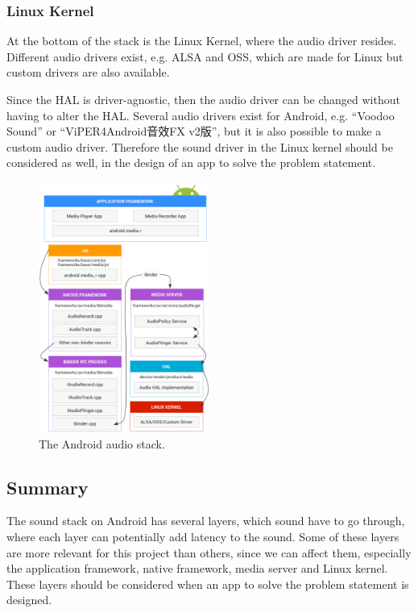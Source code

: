 \subsubsection*{Linux Kernel}
At the bottom of the stack is the Linux Kernel, where the audio driver resides.
Different audio drivers exist, e.g. \ac{ALSA} and \ac{OSS}, which are made for Linux but custom drivers are also available.

Since the \ac{HAL} is driver-agnostic, then the audio driver can be changed without having to alter the \ac{HAL}.
Several audio drivers exist for Android, e.g. ``Voodoo Sound'' or ``ViPER4Android音效FX v2版'',
but it is also possible to make a custom audio driver\cite{voodoo_sound}\cite{viper4_android}.
Therefore the sound driver in the Linux kernel should be considered as well, in the design of an app to solve the problem statement.
\begin{figure}[!bht]
    \centering
    \includegraphics[width=0.5\textwidth]{img/sound_stack.png}
    \caption{The Android audio stack\cite{sound_stack}.}
    \label{fig:sound_stack}
\end{figure}

\subsection{Summary}
The sound stack on Android has several layers, which sound have to go through,
where each layer can potentially add latency to the sound.
Some of these layers are more relevant for this project than others, since we can affect them,
especially the application framework, native framework, media server and Linux kernel.
These layers should be considered when an app to solve the problem statement is designed.


